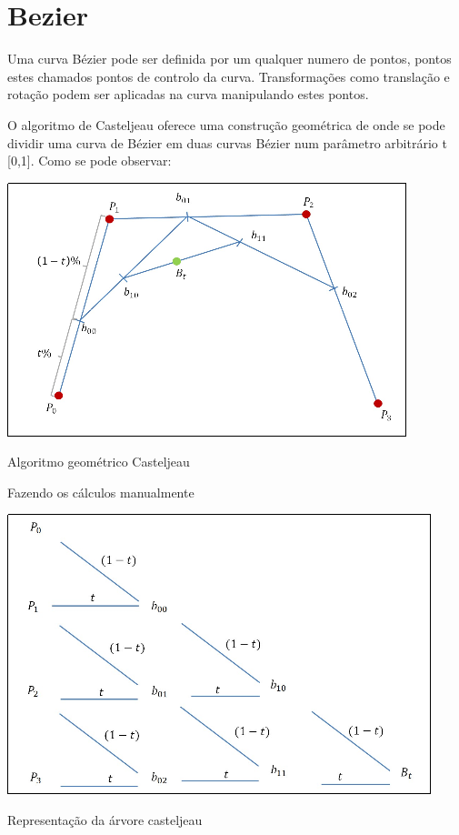 \section{Bezier}

Uma curva Bézier pode ser definida por um qualquer numero de pontos, pontos
estes chamados pontos de controlo da curva. Transformações como translação
e rotação podem ser aplicadas na curva manipulando estes pontos. 

O algoritmo de Casteljeau oferece uma construção geométrica de onde se pode
dividir uma curva de Bézier em duas curvas Bézier num parâmetro arbitrário t [0,1]. Como se pode observar:

\begin{center}
 	
 	\includegraphics[scale=0.7,keepaspectratio]{resources/casteljou.png}
 	\captionsetup{type=figure, width=0.8\linewidth}
	\caption{Algoritmo geométrico Casteljeau}
\label{fig:ssec1:diagram:plane:to:sphere} 
\end{center}

Fazendo os cálculos manualmente 
\begin{center}
 	
 	\includegraphics[scale=0.7,keepaspectratio]{resources/casteljeau2.png}
 	\captionsetup{type=figure, width=0.8\linewidth}
	\caption{Representação da árvore casteljeau}
\label{fig:ssec1:diagram:plane:to:sphere} 
\end{center}

